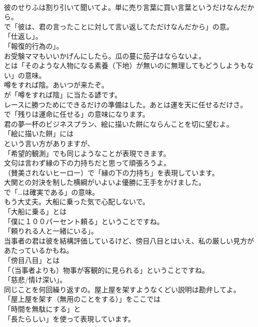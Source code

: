 \documentclass[8pt]{extreport}
\begin{document}
\begin{CJK}{UTF8}{min}
\\	彼のせりふは割り引いて聞いてよ。単に売り言葉に買い言葉というだけなんだから。 
\\	で「彼は、君の言ったことに対して言い返してただけなんだから」の意。
\\	「仕返し」。
\\	「報復的行為の」。	
\\	お受験ママもいいかげんにしたら。瓜の蔓に茄子はならないよ。 
\\	とは「そのような人物になる素養（下地）が無いのに無理してもどうしようもない」の意味。	
\\	噂をすれば陰。あいつが来たぞ。 
\\	が「噂をすれば陰」に当たる諺です。	
\\	レースに勝つためにできるだけの準備はした。あとは運を天に任せるだけさ。 
\\	で「残りは運命に任せる」の意味になります。	
\\	君の夢一杯のビジネスプラン、絵に描いた餅にならんことを切に望むよ。 
\\	「絵に描いた餅」には
\\	という言い方がありますが、
\\	「希望的観測」でも同じようなことが表現できます。	
\\	文句は言わず縁の下の力持ちだと思って頑張ろうよ。 
\\	（賛美されないヒーロー）で「縁の下の力持ち」を表現しています。	
\\	大関との対決を制した横綱がいよいよ優勝に王手をかけました。 
\\	で「…は確実である」の意味。	
\\	もう大丈夫。大船に乗った気で心配しないで。 
\\	「大船に乗る」とは
\\	「僕に１００パーセント頼る」ということですね。
\\	「頼りれる人と一緒にいる」。	
\\	当事者の君は彼を結構評価しているけど、傍目八目とはいえ、私の厳しい見方があたっているかもね。 
\\	「傍目八目」とは
\\	「（当事者よりも）物事が客観的に見られる」ということですね。
\\	「慈悲/情け深い」。	
\\	同じことを何回繰り返すの。屋上屋を架すようなくどい説明は勘弁してよ。 
\\	「屋上屋を架す（無用のことをする）」をここでは
\\	「時間を無駄にする」と
\\	「長たらしい」を使って表現しています。	

\end{CJK}
\end{document}

